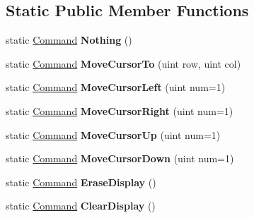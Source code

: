 \subsection*{Static Public Member Functions}
\begin{DoxyCompactItemize}
\item 
\hypertarget{class_t_c_o_m_1_1_command_a6a82f8e7e80f913fd189f5405d89bc0d}{static \hyperlink{class_t_c_o_m_1_1_command}{Command} {\bfseries Nothing} ()}\label{class_t_c_o_m_1_1_command_a6a82f8e7e80f913fd189f5405d89bc0d}

\item 
\hypertarget{class_t_c_o_m_1_1_command_a01a0fc4e3bbdab1234e8d25d78b9820b}{static \hyperlink{class_t_c_o_m_1_1_command}{Command} {\bfseries Move\-Cursor\-To} (uint row, uint col)}\label{class_t_c_o_m_1_1_command_a01a0fc4e3bbdab1234e8d25d78b9820b}

\item 
\hypertarget{class_t_c_o_m_1_1_command_a11630f66cddbd9b9cebfc097fe22912e}{static \hyperlink{class_t_c_o_m_1_1_command}{Command} {\bfseries Move\-Cursor\-Left} (uint num=1)}\label{class_t_c_o_m_1_1_command_a11630f66cddbd9b9cebfc097fe22912e}

\item 
\hypertarget{class_t_c_o_m_1_1_command_a1c76e2b8c18e0e9776f713ca3c7b30d9}{static \hyperlink{class_t_c_o_m_1_1_command}{Command} {\bfseries Move\-Cursor\-Right} (uint num=1)}\label{class_t_c_o_m_1_1_command_a1c76e2b8c18e0e9776f713ca3c7b30d9}

\item 
\hypertarget{class_t_c_o_m_1_1_command_aa0e81e802588613f6b29b96b2dab1d4c}{static \hyperlink{class_t_c_o_m_1_1_command}{Command} {\bfseries Move\-Cursor\-Up} (uint num=1)}\label{class_t_c_o_m_1_1_command_aa0e81e802588613f6b29b96b2dab1d4c}

\item 
\hypertarget{class_t_c_o_m_1_1_command_a923bffa52cd380d5793a95f88a823a9f}{static \hyperlink{class_t_c_o_m_1_1_command}{Command} {\bfseries Move\-Cursor\-Down} (uint num=1)}\label{class_t_c_o_m_1_1_command_a923bffa52cd380d5793a95f88a823a9f}

\item 
\hypertarget{class_t_c_o_m_1_1_command_a4727307ff89b9ad8109b6813422185ee}{static \hyperlink{class_t_c_o_m_1_1_command}{Command} {\bfseries Erase\-Display} ()}\label{class_t_c_o_m_1_1_command_a4727307ff89b9ad8109b6813422185ee}

\item 
\hypertarget{class_t_c_o_m_1_1_command_aec7afe45d367a5484a31619673a1bbe0}{static \hyperlink{class_t_c_o_m_1_1_command}{Command} {\bfseries Clear\-Display} ()}\label{class_t_c_o_m_1_1_command_aec7afe45d367a5484a31619673a1bbe0}


\end{DoxyCompactItemize}
